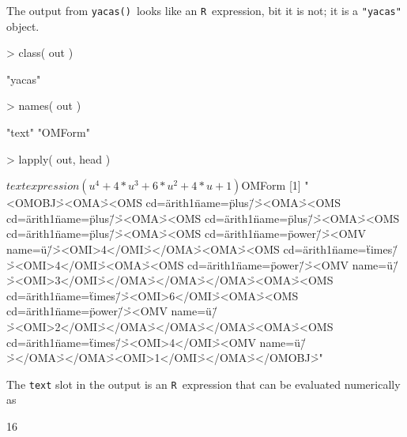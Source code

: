 \documentclass[10pt]{article}
\newcommand{\code}[1]{{\tt #1}}
\def\R{\texttt{R}}
\def\yacfun{\texttt{yacas()}}
\begin{document}
The output from \yacfun\ looks like an \R\ expression, bit it is not;
it is a \code{"yacas"} object.

\begin{Schunk}
\begin{Sinput}
> class( out )
\end{Sinput}
\begin{Soutput}
[1] "yacas"
\end{Soutput}
\begin{Sinput}
> names( out )
\end{Sinput}
\begin{Soutput}
[1] "text"   "OMForm"
\end{Soutput}
\begin{Sinput}
> lapply( out, head )
\end{Sinput}
\begin{Soutput}
$text
expression(u^4 + 4 * u^3 + 6 * u^2 + 4 * u + 1)

$OMForm
[1] "<OMOBJ>\r\n  <OMA>\r\n    <OMS cd=\"arith1\" name=\"plus\"/>\r\n    <OMA>\r\n      <OMS cd=\"arith1\" name=\"plus\"/>\r\n      <OMA>\r\n        <OMS cd=\"arith1\" name=\"plus\"/>\r\n        <OMA>\r\n          <OMS cd=\"arith1\" name=\"plus\"/>\r\n          <OMA>\r\n            <OMS cd=\"arith1\" name=\"power\"/>\r\n            <OMV name=\"u\"/>\r\n            <OMI>4</OMI>\r\n          </OMA>\r\n          <OMA>\r\n            <OMS cd=\"arith1\" name=\"times\"/>\r\n            <OMI>4</OMI>\r\n            <OMA>\r\n              <OMS cd=\"arith1\" name=\"power\"/>\r\n              <OMV name=\"u\"/>\r\n              <OMI>3</OMI>\r\n            </OMA>\r\n          </OMA>\r\n        </OMA>\r\n        <OMA>\r\n          <OMS cd=\"arith1\" name=\"times\"/>\r\n          <OMI>6</OMI>\r\n          <OMA>\r\n            <OMS cd=\"arith1\" name=\"power\"/>\r\n            <OMV name=\"u\"/>\r\n            <OMI>2</OMI>\r\n          </OMA>\r\n        </OMA>\r\n      </OMA>\r\n      <OMA>\r\n        <OMS cd=\"arith1\" name=\"times\"/>\r\n        <OMI>4</OMI>\r\n        <OMV name=\"u\"/>\r\n      </OMA>\r\n    </OMA>\r\n    <OMI>1</OMI>\r\n  </OMA>\r\n</OMOBJ>\r\n"
\end{Soutput}
\end{Schunk}

The \code{text} slot in the output is an \R\ expression that can be
evaluated numerically as
\begin{Schunk}
\begin{Soutput}
[1] 16
\end{Soutput}
\end{Schunk}
\end{document}
